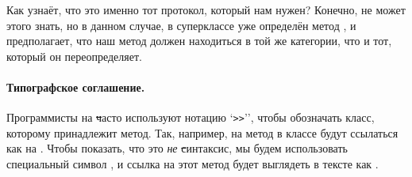 \documentclass[a4paper,10pt,twoside]{book}
\begin{document}
{%
Как \pharo узнаёт, что это именно тот протокол, который нам нужен? Конечно, \pharo не может этого знать, но в данном случае, в суперклассе уже определён метод , и \pharo предполагает, что наш метод  должен находиться в той же категории, что и тот, который он переопределяет.


\paragraph{Типографское соглашение.} Программисты на \st часто используют нотацию `\verb|>>|'', чтобы обозначать класс, которому принадлежит метод. Так, например, на метод  в классе  будут ссылаться как на .
Чтобы показать, что это \emph{не} \st синтаксис, мы будем использовать специальный символ \ct{>>>}, и ссылка на этот метод будет выглядеть в тексте как .

}
\end{document}
